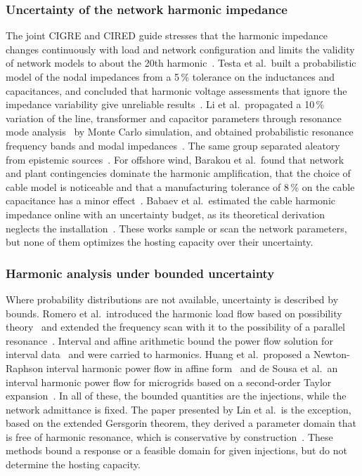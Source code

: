 \subsubsection{Uncertainty of the network harmonic impedance}
The joint CIGRE and CIRED guide stresses that the harmonic impedance changes continuously with load and network configuration and limits the validity of network models to about the 20th harmonic~\cite{robert_guide_1997}. Testa et al.\ built a probabilistic model of the nodal impedances from a 5\,\% tolerance on the inductances and capacitances, and concluded that harmonic voltage assessments that ignore the impedance variability give unreliable results~\cite{testa_probabilistic_2002}. Li et al.\ propagated a 10\,\% variation of the line, transformer and capacitor parameters through resonance mode analysis~\cite{xu_harmonic_2005,huang_application_2007} by Monte Carlo simulation, and obtained probabilistic resonance frequency bands and modal impedances~\cite{li_probabilistic_2018}. The same group separated aleatory from epistemic sources~\cite{li2020}. For offshore wind, Barakou et al.\ found that network and plant contingencies dominate the harmonic amplification, that the choice of cable model is noticeable and that a manufacturing tolerance of 8\,\% on the cable capacitance has a minor effect~\cite{barakou_parameter_2023}. Babaev et al.\ estimated the cable harmonic impedance online with an uncertainty budget, as its theoretical derivation neglects the installation~\cite{babaev_online_2020}. These works sample or scan the network parameters, but none of them optimizes the hosting capacity over their uncertainty.

\subsubsection{Harmonic analysis under bounded uncertainty}

Where probability distributions are not available, uncertainty is described by bounds. Romero et al.\ introduced the harmonic load flow based on possibility theory~\cite{romero_harmonic_2011} and extended the frequency scan with it to the possibility of a parallel resonance~\cite{romero_frequency_2018}. Interval and affine arithmetic bound the power flow solution for interval data~\cite{vaccaro_affine_2010} and were carried to harmonics. Huang et al.\ proposed a Newton-Raphson interval harmonic power flow in affine form~\cite{huang_newton_2017} and de Sousa et al.\ an interval harmonic power flow for microgrids based on a second-order Taylor expansion~\cite{desousa_interval_2024}. In all of these, the bounded quantities are the injections, while the network admittance is fixed. The paper presented by Lin et al.\ is the exception, based on the extended Gersgorin theorem, they derived a parameter domain that is free of harmonic resonance, which is conservative by construction~\cite{lin_extended_2017}. These methods bound a response or a feasible domain for given injections, but do not determine the hosting capacity.

